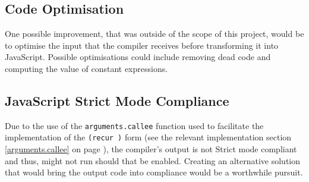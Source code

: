 \subsection{Code Optimisation}
One possible improvement, that was outside of the scope of this project, would be to optimise the input that the compiler receives before transforming it into JavaScript. Possible optimisations could include removing dead code and  computing the value of constant expressions.

\subsection{JavaScript Strict Mode Compliance}
Due to the use of the \texttt{arguments.callee} function used to facilitate the implementation of the \texttt{(recur )} form (see the relevant implementation section \ref{arguments.callee} on page \pageref{arguments.callee}), the compiler's output is not Strict mode compliant and thus, might not run should that be enabled.
Creating an alternative solution that would bring the output code into compliance would be a worthwhile pursuit.
